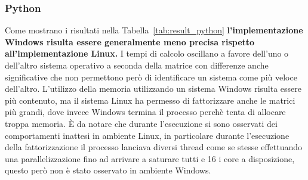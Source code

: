 \documentclass[a4paper, 12pt]{article}
\begin{document}
\subsubsection{Python}
Come mostrano i risultati nella Tabella~\ref{tab:result_python}
\textbf{l'implementazione Windows risulta essere generalmente meno precisa
rispetto all'implementazione Linux.}
I tempi di calcolo oscillano a favore dell'uno o dell'altro sistema operativo a
seconda della matrice con differenze anche significative che non permettono però
di identificare un sistema come più veloce dell'altro.
L'utilizzo della memoria utilizzando un sistema Windows risulta essere più
contenuto, ma il sistema Linux ha permesso di fattorizzare anche le matrici più
grandi, dove invece Windows termina il processo perchè tenta di allocare troppa
memoria.
\`E da notare che durante l'esecuzione si sono osservati dei comportamenti
inattesi in ambiente Linux, in particolare durante l'esecuzione della
fattorizzazione il processo lanciava diversi thread come se stesse effettuando
una parallelizzazione fino ad arrivare a saturare tutti e 16 i core a
disposizione, questo però non è stato osservato in ambiente Windows.
\end{document}
